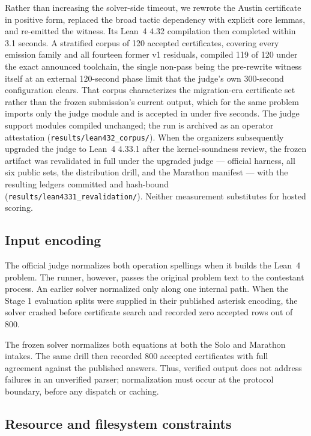 \documentclass[10pt,twocolumn]{article}
\newcommand{\lean}{Lean~4\xspace}
\newcommand{\code}[1]{\texttt{#1}}
\begin{document}
Rather than increasing the solver-side timeout, we rewrote the Austin
certificate in positive form, replaced the broad tactic dependency with
explicit core lemmas, and re-emitted the witness.  Its \lean 4.32 compilation
then completed within 3.1 seconds.  A stratified corpus of 120 accepted certificates, covering every emission
family and all fourteen former v1 residuals, compiled 119 of 120 under the
exact announced toolchain, the single non-pass being the pre-rewrite witness
itself at an external 120-second phase limit that the judge's own 300-second
configuration clears.  That corpus characterizes the migration-era certificate
set rather than the frozen submission's current output, which for the same
problem imports only the judge module and is accepted in under five seconds.
The judge support modules compiled unchanged; the run is archived as an
operator attestation (\code{results/lean432\_corpus/}).  When the organizers subsequently upgraded
the judge to \lean 4.33.1 after the kernel-soundness review, the frozen
artifact was revalidated in full under the upgraded judge --- official harness,
all six public sets, the distribution drill, and the Marathon manifest --- with
the resulting ledgers committed and hash-bound
(\code{results/lean4331\_revalidation/}).  Neither measurement substitutes for
hosted scoring.

\subsection{Input encoding}
\label{sec:encoding}

The official judge normalizes both operation spellings when it builds the
\lean problem.  The runner, however, passes the original problem text to
the contestant process.  An earlier solver normalized only along one internal
path.  When the Stage 1 evaluation splits were supplied in their published
asterisk encoding, the solver crashed before certificate search and recorded
zero accepted rows out of 800.

The frozen solver normalizes both equations at both the Solo and Marathon intakes.
The same drill then recorded 800 accepted certificates with full agreement
against the published answers.  Thus, verified output does not address failures
in an unverified parser; normalization must occur at the protocol boundary,
before any dispatch or caching.

\subsection{Resource and filesystem constraints}
\end{document}
